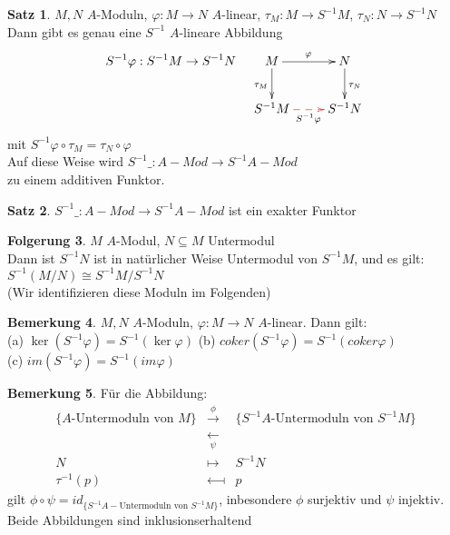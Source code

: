 \documentclass[10pt,a4paper,numbers=endperiod]{scrreprt}
\theoremstyle{definition}
\newtheorem{satz}{Satz}[section]
\newtheorem{bem}[satz]{Bemerkung}
\newtheorem{folg}[satz]{Folgerung}
\begin{document}
\begin{satz}
	$M, N$ $A$-Moduln, $\varphi: M \to N$ $A$-linear, $\tau_M: M \to S^{-1}M$, $\tau_N: N \to S^{-1}N$\\
	Dann gibt es genau eine $S^{-1}$ $A$-lineare Abbildung \begin{align*}
		S^{-1} \varphi: S^{-1} M \to S^{-1}N \hspace*{4mm} \begin{xy}
		\xymatrix{
			M \ar[r]^{\varphi} \ar[d]_{\tau_M}   &   N \ar[d]^{\tau_N}\\
			S^{-1}M \ar@{-->}@[red][r]_{S^{-1} \varphi} & S^{-1}N
		}
		\end{xy}
	\end{align*}
	mit $S^{-1} \varphi \circ \tau_M = \tau_N \circ \varphi$\\
	Auf diese Weise wird $S^{-1}\_: A-Mod \to S^{-1}A-Mod$\\
	zu einem additiven Funktor.
\end{satz}

\begin{satz}
	$S^{-1}\_: A-Mod \to S^{-1}A-Mod$ ist ein exakter Funktor
\end{satz}

\begin{folg}
	$M$ $A$-Modul, $N \subseteq M$ Untermodul\\
	Dann ist $S^{-1}N$ ist in natürlicher Weise Untermodul von $S^{-1}M$, und es gilt: $S^{-1}(M/N) \cong S^{-1} M/S^{-1}N$\\
	(Wir identifizieren diese Moduln im Folgenden)
\end{folg}

\begin{bem}
	$M, N$ $A$-Moduln, $\varphi: M \to N$ $A$-linear. Dann gilt:\\
	(a) $\ker (S^{-1} \varphi) = S^{-1} (\ker \varphi)$
	(b) $coker(S^{-1}\varphi) = S^{-1} (coker \varphi)$\\
	(c) $im(S^{-1} \varphi) = S^{-1}(im \varphi)$
\end{bem}

\begin{bem}
	Für die Abbildung: \begin{eqnarray*}
		\{\text{$A$-Untermoduln von $M$}\} &\overset{\phi}{\longrightarrow}& \{\text{$S^{-1}A$-Untermoduln von $S^{-1}M$}\}\\
		&\underset{\psi}{\longleftarrow}&\\
		N &\longmapsto& S^{-1}N\\
		\tau^{-1}(p) &\longmapsfrom& p
	\end{eqnarray*}
	gilt $\phi \circ \psi = id_{\{S^{-1}A - \text{Untermoduln von } S^{-1}M\}}$, inbesondere $\phi$ surjektiv und $\psi$ injektiv. Beide Abbildungen sind inklusionserhaltend
\end{bem}
\end{document}

